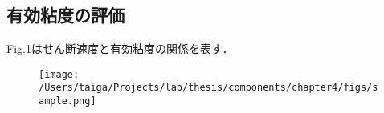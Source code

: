 \subsection{有効粘度の評価}
Fig.\ref{fig:estimate_eff_viscocity}はせん断速度と有効粘度の関係を表す．

    \begin{figure}
        \centering
        \texttt{[image: /Users/taiga/Projects/lab/thesis/components/chapter4/figs/sample.png]}
        \caption{}
        \label{fig:estimate_eff_viscocity}
    \end{figure}

